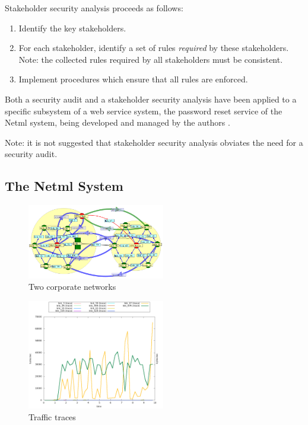 Stakeholder security analysis proceeds as follows: 
\begin{enumerate}[1.]
\item Identify the key stakeholders.
\item For each stakeholder, identify a set of rules {\em required}
by these stakeholders. Note: the collected rules required
by all stakeholders must be consistent.
\item Implement procedures which ensure that all rules are enforced.
\end{enumerate}


Both a security audit and a stakeholder security analysis have been applied to a specific subsystem of a web service system, the password reset service of the Netml system, being developed and managed by the authors \cite{sheniar2018experiments}.

Note: it is not suggested that stakeholder security analysis obviates
the need for a security audit.

\subsection{The Netml System}
\begin{figure}
	\centering
		\includegraphics[width=6cm]{figures/vpn.png}
\caption{Two corporate networks }
\label{corporatenetwork}
\end{figure}

\begin{figure}
	\centering
		\includegraphics[width=6cm]{figures/vpn_traffic.png}
\caption{Traffic traces}
\label{Traffictraces}
\end{figure}

